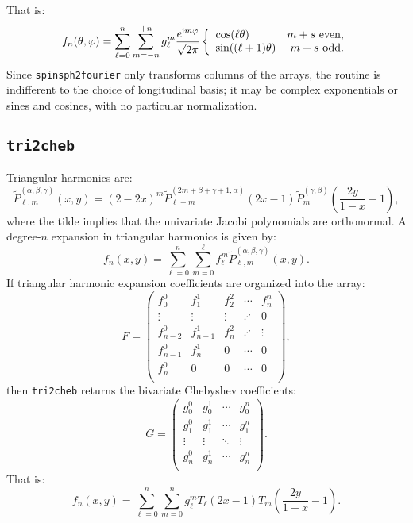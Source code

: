 \documentclass{article}
\def\ii{{\rm i}}
\begin{document}
That is:
\begin{equation}
f_n(\theta,\varphi) = \sum_{\ell=0}^n\sum_{m=-n}^{+n} g_\ell^m \frac{e^{\ii m\varphi}}{\sqrt{2\pi}} \left\{\begin{array}{lr} \cos(\ell\theta) & m+s~{\rm even},\\ \sin((\ell+1)\theta) & m+s~{\rm odd}.\end{array}\right.
\end{equation}
Since {\tt spinsph2fourier} only transforms columns of the arrays, the routine is indifferent to the choice of longitudinal basis; it may be complex exponentials or sines and cosines, with no particular normalization.

\subsection{{\tt tri2cheb}}

Triangular harmonics are:
\begin{equation}
\tilde{P}_{\ell,m}^{(\alpha,\beta,\gamma)}(x,y) = (2-2x)^m \tilde{P}_{\ell-m}^{(2m+\beta+\gamma+1,\alpha)}(2x-1) \tilde{P}_m^{(\gamma,\beta)}\left(\frac{2y}{1-x}-1\right),
\end{equation}
where the tilde implies that the univariate Jacobi polynomials are orthonormal. A degree-$n$ expansion in triangular harmonics is given by:
\begin{equation}
f_n(x,y) = \sum_{\ell=0}^{n}\sum_{m = 0}^\ell f_\ell^m \tilde{P}_{\ell,m}^{(\alpha,\beta,\gamma)}(x,y).
\end{equation}
If triangular harmonic expansion coefficients are organized into the array:
\begin{equation}
F = \begin{pmatrix}
f_0^0 & f_1^1 & f_2^2 & \cdots & f_n^n\\
\vdots & \vdots &  \vdots & \iddots & 0\\
f_{n-2}^0 & f_{n-1}^1 & f_n^2 & \iddots & \vdots\\
f_{n-1}^0 & f_n^1 & 0 & \cdots & 0\\
f_n^0 & 0 & 0 & \cdots & 0\\
\end{pmatrix},
\end{equation}
then {\tt tri2cheb} returns the bivariate Chebyshev coefficients:
\begin{equation}
G = \begin{pmatrix}
g_0^0 & g_0^1 & \cdots & g_0^n\\
g_1^0 & g_1^1 & \cdots & g_1^n\\
\vdots & \vdots & \ddots & \vdots\\
g_n^0 & g_n^1 & \cdots & g_n^n\\
\end{pmatrix}.
\end{equation}
That is:
\begin{equation}
f_n(x,y) = \sum_{\ell=0}^n\sum_{m=0}^n g_\ell^m T_\ell(2x-1) T_m\left(\frac{2y}{1-x}-1\right).
\end{equation}
\end{document}
